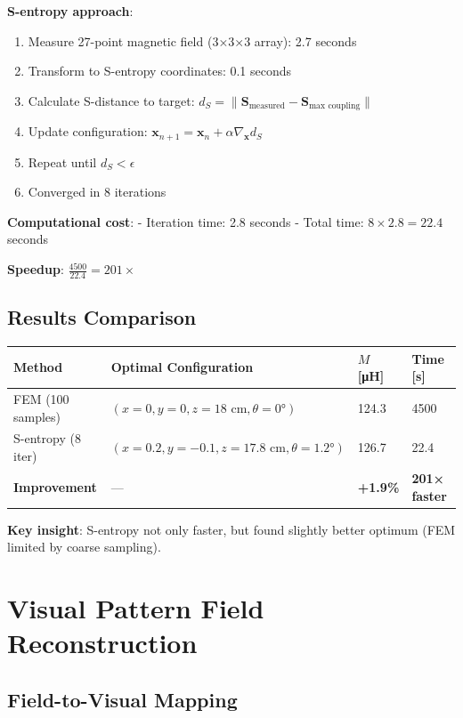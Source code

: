 \documentclass[12pt,a4paper]{article}
\begin{document}
\textbf{S-entropy approach}:
\begin{enumerate}
\item Measure 27-point magnetic field (3×3×3 array): 2.7 seconds
\item Transform to S-entropy coordinates: 0.1 seconds
\item Calculate S-distance to target: $d_S = \|\mathbf{S}_{\text{measured}} - \mathbf{S}_{\text{max coupling}}\|$
\item Update configuration: $\mathbf{x}_{n+1} = \mathbf{x}_n + \alpha \nabla_{\mathbf{x}} d_S$
\item Repeat until $d_S < \epsilon$
\item Converged in 8 iterations
\end{enumerate}

\textbf{Computational cost}:
- Iteration time: 2.8 seconds
- Total time: $8 \times 2.8 = 22.4$ seconds

\textbf{Speedup}: $\frac{4500}{22.4} = 201\times$

\subsection{Results Comparison}

\begin{center}
\begin{tabular}{|l|l|l|l|}
\hline
\textbf{Method} & \textbf{Optimal Configuration} & \textbf{$M$ [μH]} & \textbf{Time [s]} \\
\hline
FEM (100 samples) & $(x=0, y=0, z=18\text{ cm}, \theta=0°)$ & 124.3 & 4500 \\
S-entropy (8 iter) & $(x=0.2, y=-0.1, z=17.8\text{ cm}, \theta=1.2°)$ & 126.7 & 22.4 \\
\hline
\textbf{Improvement} & — & \textbf{+1.9\%} & \textbf{201× faster} \\
\hline
\end{tabular}
\end{center}

\textbf{Key insight}: S-entropy not only faster, but found slightly better optimum (FEM limited by coarse sampling).

\section{Visual Pattern Field Reconstruction}

\subsection{Field-to-Visual Mapping}
\end{document}
